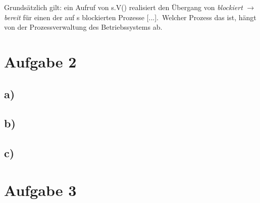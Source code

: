 \documentclass[11pt,a4paper,DIV=10,]{scrartcl}
\begin{document}
Grundsätzlich gilt: \glqq[...] ein Aufruf von s.V() realisiert den Übergang von \textit{blockiert} $\rightarrow$ \textit{bereit} für einen der auf s blockierten Prozesse [...]\cite[vgl.][S. 55]{Maurer.2012}.\grqq\ Welcher Prozess das ist, hängt von der Prozessverwaltung des Betriebssystems ab.

\section*{Aufgabe 2}
\subsection*{a)}
\subsection*{b)}
\subsection*{c)}
\section*{Aufgabe 3}
\end{document}
